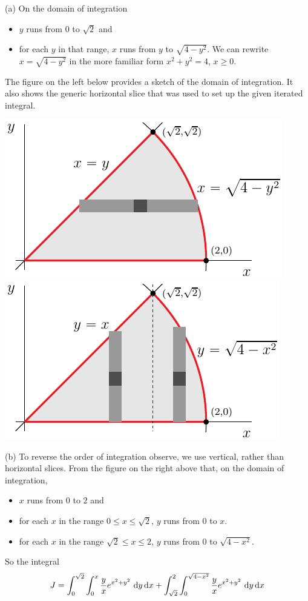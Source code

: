 \begin{solution}
(a)
On the domain of integration
\begin{itemize}
\item 
  $y$ runs from $0$ to $\sqrt{2}$ and
\item
  for each $y$ in that range, $x$ runs from $y$ to $\sqrt{4-y^2}$.
  We can rewrite $x=\sqrt{4-y^2}$ in the more familiar form $x^2+y^2=4$,
  $x\ge 0$.
\end{itemize}
The figure on the left below provides a sketch of the domain of integration.
It also shows the generic horizontal slice that was used to set up the given 
iterated integral.

\begin{center}
     \includegraphics[scale=1.0]{fig/OE11A_6a.pdf}\quad
     \includegraphics[scale=1.0]{fig/OE11A_6b.pdf}
\end{center}


(b)
To reverse the order of integration observe, we use vertical, rather than
horizontal slices. From the figure on the
right above that, on the domain of integration,
\begin{itemize}
\item 
  $x$ runs from $0$ to $2$ and
\item
  for each $x$ in the range $0\le x\le\sqrt{2}$, $y$ runs from $0$ 
  to $x$.
\item
  for each $x$ in the range $\sqrt{2}\le x\le 2$, $y$ runs from $0$ 
  to $\sqrt{4-x^2}$.
\end{itemize}
So the integral
\begin{equation*}
J = \int_0^{\sqrt{2}}\int_0^x \frac{y}{x}  e^{x^2+y^2}\ \dee{y}\,\dee{x}
   + \int_{\sqrt{2}}^2\int_0^{\sqrt{4-x^2}} \frac{y}{x}  e^{x^2+y^2}\ \dee{y}\,\dee{x}
\end{equation*}


\end{solution}
